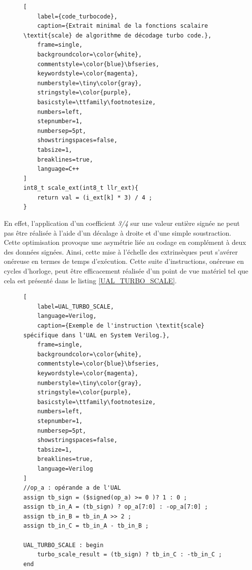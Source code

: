 \documentclass[../main.tex]{subfiles}
\begin{document}
\begin{figure}[tb]
\begin{lstlisting}[
    label={code_turbocode},
    caption={Extrait minimal de la fonctions scalaire \textit{scale} de algorithme de décodage turbo code.},
    frame=single,
    backgroundcolor=\color{white},  
    commentstyle=\color{blue}\bfseries,
    keywordstyle=\color{magenta},
    numberstyle=\tiny\color{gray},
    stringstyle=\color{purple},
    basicstyle=\ttfamily\footnotesize,
    numbers=left,
    stepnumber=1,
    numbersep=5pt,                 
    showstringspaces=false,
    tabsize=1,
    breaklines=true,
    language=C++
]
int8_t scale_ext(int8_t llr_ext){
    return val = (i_ext[k] * 3) / 4 ;
}
\end{lstlisting}
\end{figure}

En effet, l'application d'un coefficient \textit{3/4} sur une valeur entière signée ne peut pas être réalisée à l'aide d'un décalage à droite et d'une simple soustraction. Cette optimisation provoque une asymétrie liée au codage en complément à deux des données signées. Ainsi, cette mise à l'échelle des extrinsèques peut s'avérer onéreuse en termes de temps d'exécution. Cette suite d'instructions, onéreuse en cycles d'horloge, peut être efficacement réalisée d'un point de vue matériel tel que cela est présenté dans le listing \ref{UAL_TURBO_SCALE}.

\begin{figure}[tb]
\begin{lstlisting}[
    label=UAL_TURBO_SCALE,
    language=Verilog, 
    caption={Exemple de l'instruction \textit{scale} spécifique dans l'UAL en System Verilog.},
    frame=single,
    backgroundcolor=\color{white},  
    commentstyle=\color{blue}\bfseries,
    keywordstyle=\color{magenta},
    numberstyle=\tiny\color{gray},
    stringstyle=\color{purple},
    basicstyle=\ttfamily\footnotesize,
    numbers=left,
    stepnumber=1,
    numbersep=5pt,                 
    showstringspaces=false,
    tabsize=1,
    breaklines=true,
    language=Verilog
]
//op_a : opérande a de l'UAL 
assign tb_sign = ($signed(op_a) >= 0 )? 1 : 0 ; 			
assign tb_in_A = (tb_sign) ? op_a[7:0] : -op_a[7:0] ; 
assign tb_in_B = tb_in_A >> 2 ; 
assign tb_in_C = tb_in_A - tb_in_B ; 
	
UAL_TURBO_SCALE : begin 
    turbo_scale_result = (tb_sign) ? tb_in_C : -tb_in_C ;
end 
\end{lstlisting}
\end{figure}
\end{document}
